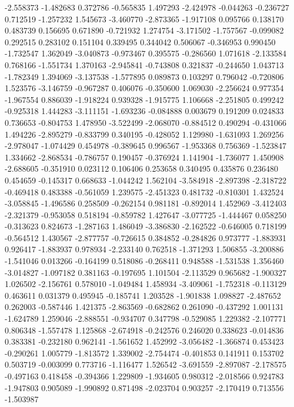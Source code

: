 -2.558373
-1.482683
0.372786
-0.565835
1.497293
-2.424978
-0.044263
-0.236727
0.712519
-1.257232
1.545673
-3.460770
-2.873365
-1.917108
0.095766
0.138170
0.483739
0.156695
0.671890
-0.721932
1.274754
-3.171502
-1.757567
-0.099082
0.292515
0.283102
0.151104
0.339495
0.344042
0.506067
-0.346953
0.990450
-1.732547
1.362049
-3.040873
-0.973467
0.395575
-0.286560
1.071618
-2.133584
0.768166
-1.551734
1.370163
-2.945841
-0.743808
0.321837
-0.244650
1.043713
-1.782349
1.394069
-3.137538
-1.577895
0.089873
0.103297
0.796042
-0.720806
1.523576
-3.146759
-0.967287
0.406076
-0.350600
1.069030
-2.256624
0.977354
-1.967554
0.886039
-1.918224
0.939328
-1.915775
1.106668
-2.251805
0.499242
-0.925318
1.444283
-3.111151
-1.693236
-0.084888
0.003679
0.191209
0.024833
0.736653
-0.804753
1.478950
-3.522499
-2.068070
-0.884512
0.490294
-0.431066
1.494226
-2.895279
-0.833799
0.340195
-0.428052
1.129980
-1.631093
1.269256
-2.978047
-1.074429
0.454978
-0.389645
0.996567
-1.953368
0.756369
-1.523847
1.334662
-2.868534
-0.786757
0.190457
-0.376924
1.141904
-1.736077
1.450908
-2.688605
-0.351910
0.023112
0.106406
0.253658
0.340495
0.435876
0.236480
0.454659
-0.145317
0.668633
-1.044242
1.562104
-3.584918
-2.897398
-2.318722
-0.469418
0.483388
-0.561059
1.239575
-2.451323
0.481732
-0.810301
1.432524
-3.058845
-1.496586
0.258509
-0.262154
0.981181
-0.892014
1.452969
-3.412403
-2.321379
-0.953058
0.518194
-0.859782
1.427647
-3.077725
-1.444467
0.058250
-0.313623
0.824673
-1.287163
1.486049
-3.386830
-2.162522
-0.646005
0.718199
-0.564512
1.430567
-2.877757
-0.726615
0.384852
-0.284826
0.973777
-1.883931
0.926417
-1.883937
0.978934
-2.233140
0.762518
-1.371293
1.506855
-3.200886
-1.541046
0.013266
-0.164199
0.518086
-0.268411
0.948588
-1.531538
1.356460
-3.014827
-1.097182
0.381163
-0.197695
1.101504
-2.113529
0.965682
-1.900327
1.026502
-2.156761
0.578010
-1.049484
1.458934
-3.409061
-1.752318
-0.113129
0.463611
0.031379
0.495945
-0.185741
1.203528
-1.901838
1.098827
-2.487652
0.262003
-0.587446
1.421375
-2.863569
-0.682862
0.261090
-0.437292
1.001131
-1.624789
1.259046
-2.888551
-0.934707
0.347798
-0.529085
1.229382
-2.107771
0.806348
-1.557478
1.125868
-2.674918
-0.242576
0.246020
0.338623
-0.014836
0.383381
-0.232180
0.962141
-1.561652
1.452992
-3.056482
-1.366874
0.453423
-0.290261
1.005779
-1.813572
1.339002
-2.754474
-0.401853
0.141911
0.153702
0.503719
-0.003099
0.773716
-1.116477
1.526542
-3.691559
-2.897087
-2.178575
-0.497163
0.418458
-0.394366
1.229809
-1.934605
0.980312
-2.018566
0.924783
-1.947803
0.905089
-1.990892
0.871498
-2.023704
0.903257
-2.170419
0.713556
-1.503987

